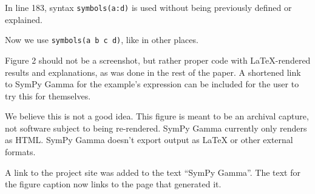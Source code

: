 \documentclass[answers,12pt]{exam}
\begin{document}
\begin{questions}
\question In line 183, syntax \texttt{symbols(\textquotesingle{}a:d\textquotesingle{})} is used without being previously defined or explained.
\begin{solution}
Now we use \texttt{symbols(\textquotesingle{}a b c d\textquotesingle{})}, like in other places.
\end{solution}

\question Figure 2 should not be a screenshot, but rather proper code with \LaTeX-rendered results and explanations, as was done in the rest of the paper. A
 shortened link to SymPy Gamma for the example's expression can be included
 for the user to try this for themselves.
\begin{solution}
We believe this is not a good idea.  This figure is meant to be an archival
capture, not software subject to being re-rendered. SymPy Gamma currently only
renders as HTML\@. SymPy Gamma doesn't export output as \LaTeX{} or other external
formats.

A link to the project site was added to the text ``SymPy Gamma''. The text for
the figure caption now links to the page that generated it.
\end{solution}

\end{questions}
\end{document}
